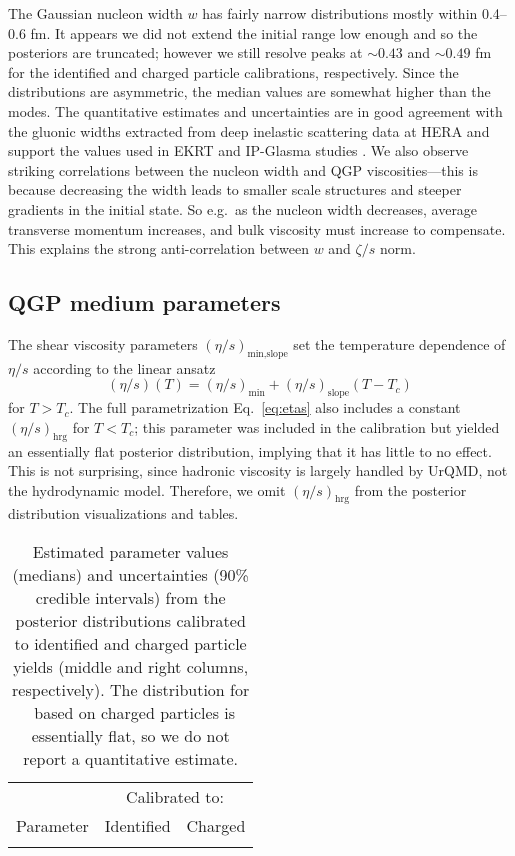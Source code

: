 \documentclass[aps,prc,reprint,amsmath,nofootinbib,noeprint]{revtex4-1}
\newcommand{\paddedhline}{\noalign{\smallskip}\hline\noalign{\smallskip}}
\begin{document}
The Gaussian nucleon width $w$ has fairly narrow distributions mostly within 0.4--0.6 fm.
It appears we did not extend the initial range low enough and so the posteriors are truncated;
however we still resolve peaks at ${\sim}0.43$ and ${\sim}0.49$ fm for the identified and charged particle calibrations, respectively.
Since the distributions are asymmetric, the median values are somewhat higher than the modes.
The quantitative estimates and uncertainties are in good agreement with the gluonic widths extracted from deep inelastic scattering data at HERA \cite{Chekanov:2004mw, Kowalski:2006hc, Rezaeian:2012ji} and support the values used in EKRT and IP-Glasma studies \cite{Niemi:2015qia, Schenke:2012wb}.
We also observe striking correlations between the nucleon width and QGP viscosities---this is because decreasing the width leads to smaller scale structures and steeper gradients in the initial state.
So e.g.\ as the nucleon width decreases, average transverse momentum increases, and bulk viscosity must increase to compensate.
This explains the strong anti-correlation between $w$ and $\zeta/s$ norm.

\subsection{QGP medium parameters}

The shear viscosity parameters $(\eta/s)_\text{min,slope}$ set the temperature dependence of $\eta/s$ according to the linear ansatz
\begin{equation}
  (\eta/s)(T) = (\eta/s)_\text{min} + (\eta/s)_\text{slope} (T - T_c)
  \label{eq:etas2}
\end{equation}
for $T > T_c$.
The full parametrization Eq.~\eqref{eq:etas} also includes a constant $(\eta/s)_\text{hrg}$ for $T < T_c$; this parameter was included in the calibration but yielded an essentially flat posterior distribution, implying that it has little to no effect.
This is not surprising, since hadronic viscosity is largely handled by UrQMD, not the hydrodynamic model.
Therefore, we omit $(\eta/s)_\text{hrg}$ from the posterior distribution visualizations and tables.

\begin{table}[b]
  \caption{
    \label{tab:posterior}
    Estimated parameter values (medians) and uncertainties (90\% credible intervals) from the posterior distributions calibrated to identified and charged particle yields (middle and right columns, respectively).
    The distribution for \Tsw\ based on charged particles is essentially flat, so we do not report a quantitative estimate.
  }
  \begin{ruledtabular}
    \begin{tabular}{lll}
      & \multicolumn{2}{c}{Calibrated to:} \\
      \noalign{\smallskip}\cline{2-3}\noalign{\smallskip}
      Parameter & \multicolumn{1}{c}{Identified} & \multicolumn{1}{c}{Charged} \\
      \paddedhline
      
    \end{tabular}
  \end{ruledtabular}
\end{table}
\end{document}
